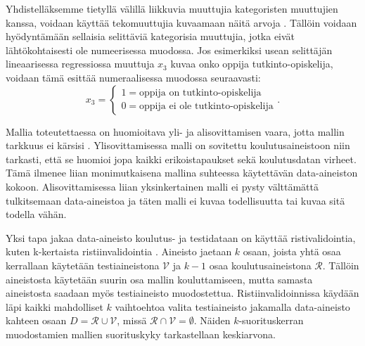 Yhdistelläksemme tietyllä välillä liikkuvia muuttujia kategoristen muuttujien kanssa, voidaan käyttää tekomuuttujia kuvaamaan näitä arvoja \citep{rossIntroductoryStatistics2017}. Tällöin voidaan hyödyntämään sellaisia selittäviä kategorisia muuttujia, jotka eivät lähtökohtaisesti ole numeerisessa muodossa. Jos esimerkiksi usean selittäjän lineaarisessa regressiossa muuttuja $x_3$ kuvaa onko oppija tutkinto-opiskelija, voidaan tämä esittää numeraalisessa muodossa seuraavasti: $$x_3 = \begin{cases}1 = \text{oppija on tutkinto-opiskelija} \\ 0 = \text{oppija ei ole tutkinto-opiskelija}\end{cases}.$$

Mallia toteutettaessa on huomioitava yli- ja alisovittamisen vaara, jotta mallin tarkkuus ei kärsisi \citep{hamalainenClassifiersEducationalData2010}. Ylisovittamisessa malli on sovitettu koulutusaineistoon niin tarkasti, että se huomioi jopa kaikki erikoistapaukset sekä koulutusdatan virheet. Tämä ilmenee liian monimutkaisena mallina suhteessa käytettävän data-aineiston kokoon. Alisovittamisessa liian yksinkertainen malli ei pysty välttämättä tulkitsemaan data-aineistoa ja täten malli ei kuvaa todellisuutta tai kuvaa sitä todella vähän.

Yksi tapa jakaa data-aineisto koulutus- ja testidataan on käyttää ristivalidointia, kuten k-kertaista ristiinvalidointia \citep{deisenrothMathematicsMachineLearning2020}. Aineisto jaetaan $k$ osaan, joista yhtä osaa kerrallaan käytetään testiaineistona $\mathcal{V}$ ja $k-1$ osaa koulutusaineistona $\mathcal{R}$. Tällöin aineistosta käytetään suurin osa mallin kouluttamiseen, mutta samasta aineistosta saadaan myös testiaineisto muodostettua. Ristiinvalidoinnissa käydään läpi kaikki mahdolliset $k$ vaihtoehtoa valita testiaineisto jakamalla data-aineisto kahteen osaan $D = \mathcal{R} \cup \mathcal{V}$, missä $\mathcal{R} \cap \mathcal{V} = \emptyset$. Näiden $k$-suorituskerran muodostamien mallien suorituskyky tarkastellaan keskiarvona.

